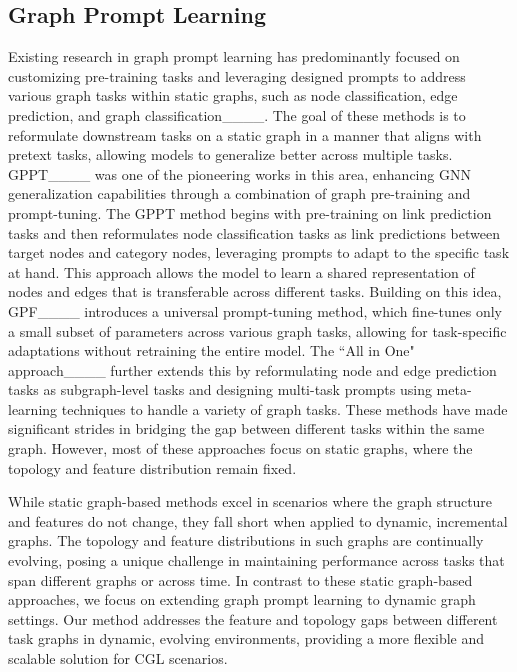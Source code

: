 \subsection{Graph Prompt Learning}

Existing research in graph prompt learning has predominantly focused on customizing pre-training tasks and leveraging designed prompts to address various graph tasks within static graphs, such as node classification, edge prediction, and graph classification____. The goal of these methods is to reformulate downstream tasks on a static graph in a manner that aligns with pretext tasks, allowing models to generalize better across multiple tasks. GPPT____ was one of the pioneering works in this area, enhancing GNN generalization capabilities through a combination of graph pre-training and prompt-tuning. The GPPT method begins with pre-training on link prediction tasks and then reformulates node classification tasks as link predictions between target nodes and category nodes, leveraging prompts to adapt to the specific task at hand. This approach allows the model to learn a shared representation of nodes and edges that is transferable across different tasks. Building on this idea, GPF____ introduces a universal prompt-tuning method, which fine-tunes only a small subset of parameters across various graph tasks, allowing for task-specific adaptations without retraining the entire model. The ``All in One" approach____ further extends this by reformulating node and edge prediction tasks as subgraph-level tasks and designing multi-task prompts using meta-learning techniques to handle a variety of graph tasks. These methods have made significant strides in bridging the gap between different tasks within the same graph. However, most of these approaches focus on static graphs, where the topology and feature distribution remain fixed.

While static graph-based methods excel in scenarios where the graph structure and features do not change, they fall short when applied to dynamic, incremental graphs. The topology and feature distributions in such graphs are continually evolving, posing a unique challenge in maintaining performance across tasks that span different graphs or across time. In contrast to these static graph-based approaches, we focus on extending graph prompt learning to dynamic graph settings. Our method addresses the feature and topology gaps between different task graphs in dynamic, evolving environments, providing a more flexible and scalable solution for CGL scenarios.